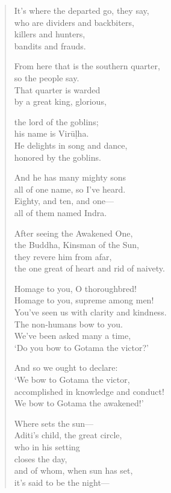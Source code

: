 \documentclass[12pt,openany]{book}%
\begin{document}
\begin{verse}
It’s where the departed go, they say, \\
who are dividers and backbiters, \\
killers and hunters, \\
bandits and frauds. 

From here that is the southern quarter, \\
so the people say. \\
That quarter is warded \\
by a great king, glorious, 

the lord of the goblins; \\
his name is \textsanskrit{Virūḷha}. \\
He delights in song and dance, \\
honored by the goblins. 

And he has many mighty sons \\
all of one name, so I’ve heard. \\
Eighty, and ten, and one—\\
all of them named Indra. 

After seeing the Awakened One, \\
the Buddha, Kinsman of the Sun, \\
they revere him from afar, \\
the one great of heart and rid of naivety. 

Homage to you, O thoroughbred! \\
Homage to you, supreme among men! \\
You’ve seen us with clarity and kindness. \\
The non-humans bow to you. \\
We’ve been asked many a time, \\
‘Do you bow to Gotama the victor?’ 

And so we ought to declare: \\
‘We bow to Gotama the victor, \\
accomplished in knowledge and conduct! \\
We bow to Gotama the awakened!’ 

Where sets the sun—\\
Aditi’s child, the great circle, \\
who in his setting \\
closes the day, \\
and of whom, when sun has set, \\
it’s said to be the night—


\end{verse}
\end{document}
